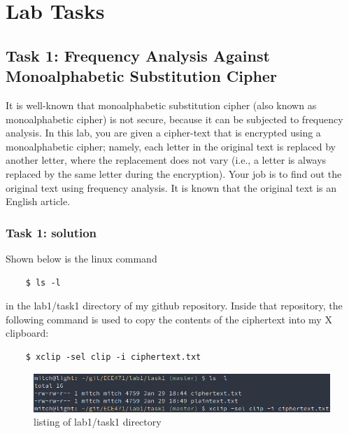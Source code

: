 \documentclass[12pt]{article}
\begin{document}
\clearpage

\section{Lab Tasks}
\subsection{Task 1: Frequency Analysis Against Monoalphabetic Substitution Cipher}
    
It is well-known that monoalphabetic substitution cipher (also known as monoalphabetic cipher) is not secure, because it can be subjected to frequency analysis. In this lab, you are given a cipher-text that is encrypted using a monoalphabetic cipher; namely, each letter in the original text is replaced by another letter, where the replacement does not vary (i.e., a letter is always replaced by the same letter during the encryption). Your job is to find out the original text using frequency analysis. It is known that the original text is an English article.

\subsubsection{Task 1: solution}

Shown below is the linux command 
\begin{verbatim}
    $ ls -l 
\end{verbatim}
in the lab1/task1 directory of my github repository. Inside that repository, the following command is used to copy the contents of the ciphertext into my X clipboard:
\begin{verbatim}
    $ xclip -sel clip -i ciphertext.txt
\end{verbatim}

\begin{figure}[!ht]
\includegraphics[scale=0.65]{c0.png}
\caption{listing of lab1/task1 directory}
\label{fig:c0}
\end{figure}
\end{document}
